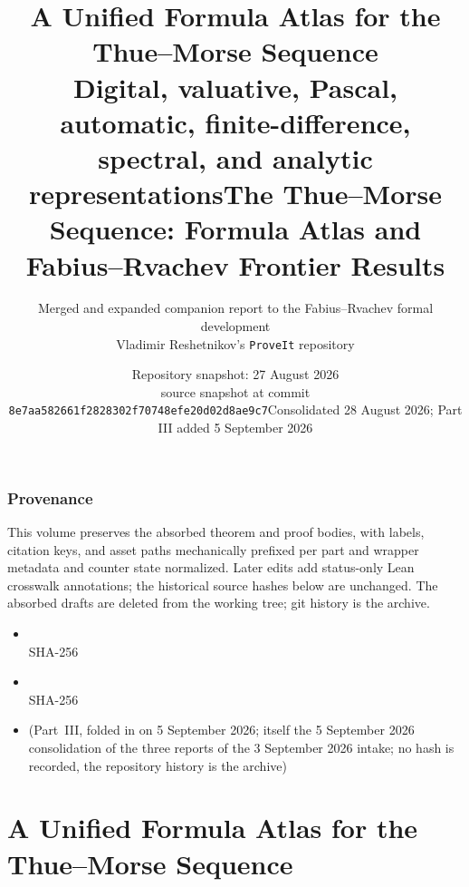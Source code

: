 \documentclass[11pt,oneside]{article}
\title{\bfseries A Unified Formula Atlas for the Thue--Morse Sequence\\[0.35em]
\large Digital, valuative, Pascal, automatic, finite-difference, spectral, and analytic representations}
\author{Merged and expanded companion report to the Fabius--Rvachev formal development\\
\small Vladimir Reshetnikov's \texttt{ProveIt} repository}
\date{Repository snapshot: 27 August 2026\\
\small source snapshot at commit \nolinkurl{8e7aa582661f2828302f70748efe20d02d8ae9c7}}
\title{\bfseries The Thue--Morse Sequence: Formula Atlas and Fabius--Rvachev Frontier Results}
\date{Consolidated 28 August 2026; Part III added 5 September 2026}
\numberwithin{equation}{section}
\theoremstyle{definition}
\theoremstyle{remark}
\begin{document}
\maketitle
\tableofcontents
\clearpage
\section*{Provenance}
This volume preserves the absorbed theorem and proof bodies, with labels, citation keys,
and asset paths mechanically prefixed per part and wrapper metadata and counter state
normalized.  Later edits add status-only Lean crosswalk annotations; the historical source
hashes below are unchanged.
The absorbed drafts are deleted from the working tree; git history is the archive.
\begin{itemize}
\item {} \\ {\footnotesize SHA-256 }
\item {} \\ {\footnotesize SHA-256 }
\item {} (Part~III, folded in on
5 September 2026; itself the 5 September 2026 consolidation of the three
 reports of the 3 September 2026 intake; no hash is
recorded, the repository history is the archive)
\end{itemize}
\clearpage
\part{A Unified Formula Atlas for the Thue--Morse Sequence}
\end{document}
